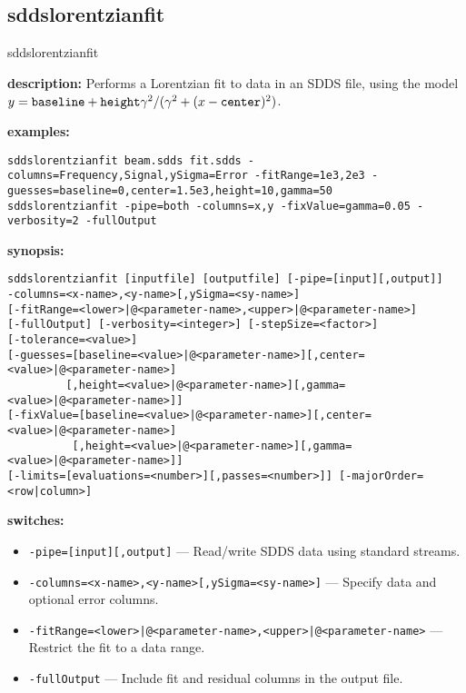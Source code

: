%
\newpage
\subsection{sddslorentzianfit}
\label{sddslorentzianfit}

\begin{sddsprog}{sddslorentzianfit}
  \item \textbf{description:}
  Performs a Lorentzian fit to data in an SDDS file, using the model
  $y = \verb|baseline| + \verb|height| \gamma^2/(\gamma^2 + (x - \verb|center|)^2)$.
  \item \textbf{examples:}
    \begin{verbatim}
sddslorentzianfit beam.sdds fit.sdds -columns=Frequency,Signal,ySigma=Error -fitRange=1e3,2e3 -guesses=baseline=0,center=1.5e3,height=10,gamma=50
sddslorentzianfit -pipe=both -columns=x,y -fixValue=gamma=0.05 -verbosity=2 -fullOutput
    \end{verbatim}
  \item \textbf{synopsis:}
    \begin{verbatim}
sddslorentzianfit [inputfile] [outputfile] [-pipe=[input][,output]]
-columns=<x-name>,<y-name>[,ySigma=<sy-name>]
[-fitRange=<lower>|@<parameter-name>,<upper>|@<parameter-name>]
[-fullOutput] [-verbosity=<integer>] [-stepSize=<factor>]
[-tolerance=<value>]
[-guesses=[baseline=<value>|@<parameter-name>][,center=<value>|@<parameter-name>]
         [,height=<value>|@<parameter-name>][,gamma=<value>|@<parameter-name>]]
[-fixValue=[baseline=<value>|@<parameter-name>][,center=<value>|@<parameter-name>]
          [,height=<value>|@<parameter-name>][,gamma=<value>|@<parameter-name>]]
[-limits=[evaluations=<number>][,passes=<number>]] [-majorOrder=<row|column>]
    \end{verbatim}
  \item \textbf{switches:}
    \begin{itemize}
      \item \verb|-pipe=[input][,output]| --- Read/write SDDS data using standard streams.
      \item \verb|-columns=<x-name>,<y-name>[,ySigma=<sy-name>]| --- Specify data and optional error columns.
      \item \verb!-fitRange=<lower>|@<parameter-name>,<upper>|@<parameter-name>! --- Restrict the fit to a data range.
      \item \verb|-fullOutput| --- Include fit and residual columns in the output file.

\end{itemize}
\end{sddsprog}
